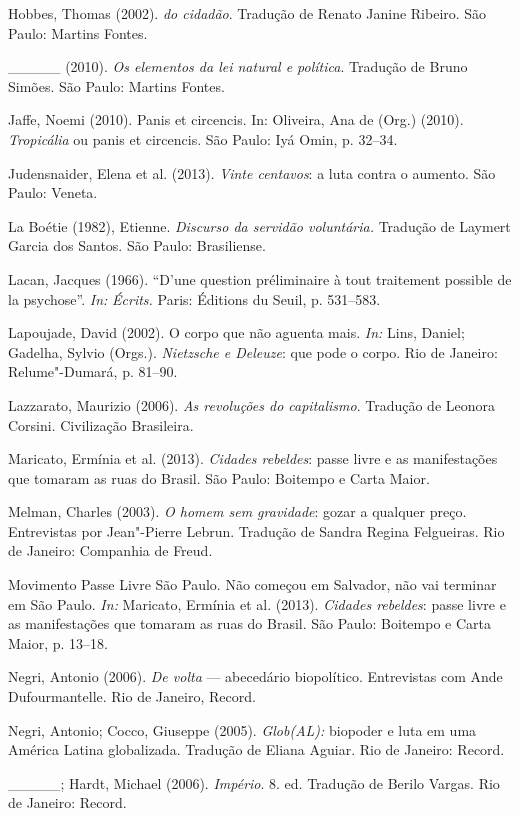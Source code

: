 Hobbes, Thomas (2002). \emph{do cidadão}. Tradução de Renato Janine
Ribeiro. São Paulo: Martins Fontes.

\_\_\_\_\_ (2010). \emph{Os elementos da lei natural e política}.
Tradução de Bruno Simões. São Paulo: Martins Fontes.

Jaffe, Noemi (2010). Panis et circencis. In: Oliveira, Ana de (Org.)
(2010). \emph{Tropicália }ou panis et circencis. São Paulo: Iyá Omin, p.
32--34.

Judensnaider, Elena et al. (2013). \emph{Vinte centavos}: a luta contra
o aumento. São Paulo: Veneta.

La Boétie (1982), Etienne. \emph{Discurso da servidão voluntária.
}Tradução de Laymert Garcia dos Santos. São Paulo: Brasiliense.

Lacan, Jacques (1966). ``D'une question préliminaire à tout traitement
possible de la psychose''. \emph{In:} \emph{Écrits. }Paris: Éditions du
Seuil, p. 531--583.

Lapoujade, David (2002). O corpo que não aguenta mais. \emph{In: }Lins,
Daniel; Gadelha, Sylvio (Orgs.).\emph{ Nietzsche e Deleuze}: que pode o
corpo. Rio de Janeiro: Relume"-Dumará, p. 81--90.

Lazzarato, Maurizio (2006). \emph{As revoluções do capitalismo}.
Tradução de Leonora Corsini. Civilização Brasileira.

Maricato, Ermínia et al. (2013). \emph{Cidades rebeldes}: passe livre e
as manifestações que tomaram as ruas do Brasil. São Paulo: Boitempo e
Carta Maior.

Melman, Charles (2003). \emph{O homem sem gravidade}: gozar a qualquer
preço. Entrevistas por Jean"-Pierre Lebrun. Tradução de Sandra Regina
Felgueiras. Rio de Janeiro: Companhia de Freud.

Movimento Passe Livre São Paulo. Não começou em Salvador, não vai
terminar em São Paulo. \emph{In: }Maricato, Ermínia et al. (2013).
\emph{Cidades rebeldes}: passe livre e as manifestações que tomaram as
ruas do Brasil. São Paulo: Boitempo e Carta Maior, p. 13--18.

Negri, Antonio (2006). \emph{De volta }--- abecedário biopolítico.
Entrevistas com Ande Dufourmantelle. Rio de Janeiro, Record.

Negri, Antonio; Cocco, Giuseppe (2005). \emph{Glob(AL): }biopoder e luta
em uma América Latina globalizada. Tradução de Eliana Aguiar. Rio de
Janeiro: Record.

\_\_\_\_\_; Hardt, Michael (2006). \emph{Império}. 8. ed. Tradução de
Berilo Vargas. Rio de Janeiro: Record.


